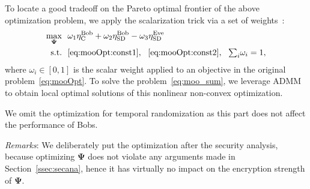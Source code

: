 \documentclass[conference,compsoc]{IEEEtran}
\newcommand{\newrev}[1]{{\color{blue}#1}}    %
\newcommand{\newrev}[1]{#1}
\begin{document}
%
To locate a good tradeoff on the Pareto optimal frontier of the above optimization problem, we apply the scalarization trick via a set of weights~\cite{cvx}:
%
\begin{align} \label{eq:moo_sum}
	\max_{\bm{ \Psi }} &~~  \omega_1 \eta_{\mathrm{C}}^{\mathrm{Bob}}  +\omega_2 \eta_{\mathrm{SD}}^{\mathrm{Bob}}   -\omega_3  \eta_{\mathrm{SD}}^{\mathrm{Eve}}   \\
	\mathrm{s.t.} &~~ \eqref{eq:mooOpt:const1},~~ \eqref{eq:mooOpt:const2},~~ \textstyle{\sum_i}  \omega_i = 1,  \label{eq:moo_sum:const3}
\end{align}
%
where $\omega_i \in [0, 1]$ is the scalar weight applied to an objective in the original problem~\eqref{eq:mooOpt}. To solve the problem~\eqref{eq:moo_sum}, we leverage ADMM~\cite{boyd2011distributed} to obtain local optimal solutions of this nonlinear non-convex optimization. 
%
\newrev{We omit the optimization for temporal randomization as this part does not affect the performance of Bobs. 

\vspace{1ex}
\noindent\emph{Remarks}: We deliberately put the optimization after the security analysis, because optimizing $\bm{\Psi}$ does not violate any arguments made in Section~\ref{ssec:secana}, hence it has virtually no impact on the encryption strength of $\bm{\Psi}$.
}
%
%
%

\vspace{-1ex}
\end{document}
